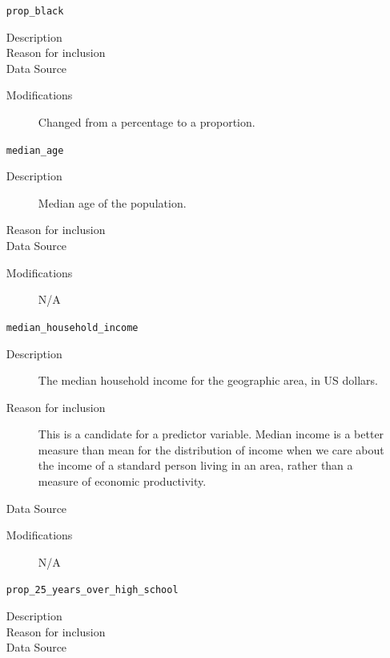 \documentclass{article}
\begin{document}
\begin{itemize}[label={}, align=left]
    \item[\texttt{prop\_black}] \
          \begin{description}
              \item[Description] 
              \item[Reason for inclusion] \descentreason
              \item[Data Source] \cite{acs_demographics_data}
              \item[Modifications] Changed from a percentage to a proportion.
          \end{description}
    \item[\texttt{median\_age}] \
          \begin{description}
              \item[Description] Median age of the population.
              \item[Reason for inclusion] \agereason
              \item[Data Source] \cite{acs_demographics_data}
              \item[Modifications] N/A
          \end{description}
    \item[\texttt{median\_household\_income}] \
          \begin{description}
              \item[Description] The median household income for the geographic area, in US dollars.
              \item[Reason for inclusion] This is a candidate for a predictor
                    variable. Median income is a better measure than mean for the
                    distribution of income when we care about the income of a
                    standard person living in an area, rather than a measure of
                    economic productivity.
              \item[Data Source] \cite{acs_income_data}
              \item[Modifications] N/A
          \end{description}
    \item[\texttt{prop\_25\_years\_over\_high\_school}] \
          \begin{description}
              \item[Description] 
              \item[Reason for inclusion] \educationreason
              \item[Data Source] \cite{acs_education_data}

\end{description}
\end{itemize}
\end{document}
